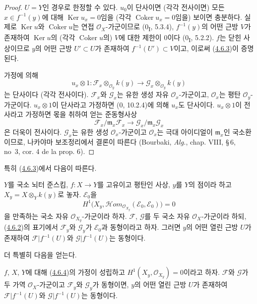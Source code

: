 \begin{proof}
$U=Y$인 경우로 한정할 수 있다. $u_0$이 단사이면 (각각 전사이면)
모든 $x\in f^{-1}(y)$에 대해 $\operatorname{Ker}u_x=0$임을
(각각 $\operatorname{Coker}u_x=0$임을) 보이면 충분하다. 실제로
$\operatorname{Ker}u$와 $\operatorname{Coker}u$는 연접
$\mathcal O_X$-가군이므로 (0\textsubscript{I}, 5.3.4),
$f^{-1}(y)$의 어떤 근방 $V$가 존재하여
$\operatorname{Ker}u$의 (각각 $\operatorname{Coker}u$의) $V$에
대한 제한이 $0$이다 (0\textsubscript{I}, 5.2.2). $f$는 닫힌
사상이므로 $y$의 어떤 근방 $U'\subset U$가 존재하여
$f^{-1}(U')\subset V$이고, 이로써
(\hyperref[III.4.6.3-fr]{4.6.3})이 증명된다.

가정에 의해
\[
u_x\otimes1:
\mathcal F_x\otimes_{\mathcal O_y}k(y)
\longrightarrow
\mathcal G_x\otimes_{\mathcal O_y}k(y)
\]
는 단사이다 (각각 전사이다). $\mathcal F_x$와 $\mathcal G_x$는
유한 생성 자유 $\mathcal O_x$-가군이고, $\mathcal O_x$는 평탄
$\mathcal O_y$-가군이다. $u_x\otimes1$이 단사라고 가정하면
(0, 10.2.4)에 의해 $u_x$도 단사이다. $u_x\otimes1$이 전사라고
가정하면 몫을 취하여 얻는 준동형사상
\[
\mathcal F_x/\mathfrak m_x\mathcal F_x
\longrightarrow
\mathcal G_x/\mathfrak m_x\mathcal G_x
\]
은 더욱이 전사이다. $\mathcal G_x$는 유한 생성
$\mathcal O_x$-가군이고 $\mathcal O_x$는 극대 아이디얼이
$\mathfrak m_x$인 국소환이므로, 나카야마 보조정리에서 결론이
따른다 (Bourbaki, \emph{Alg.}, chap. VIII, \S\,6, no~3,
cor. 4 de la prop. 6).
\end{proof}

특히 (\hyperref[III.4.6.3-fr]{4.6.3})에서 다음이 따른다.

\begin{corollary}[4.6.4]
\label{III.4.6.4-fr}
$Y$를 국소 뇌터 준스킴, $f:X\to Y$를 고유이고 평탄인 사상,
$y$를 $Y$의 점이라 하고 $X_y=X\otimes_Yk(y)$로 놓자.
$\mathcal E_0$을
\[
\label{III.4.6.4.1-fr}
H^1\bigl(X_y,
\mathcal{H}\!om_{\mathcal O_{X_y}}(\mathcal E_0,\mathcal E_0)\bigr)=0
\tag{4.6.4.1}
\]
을 만족하는 국소 자유 $\mathcal O_{X_y}$-가군이라 하자.
$\mathcal F$, $\mathcal G$를 두 국소 자유 $\mathcal O_X$-가군이라
하되, (\hyperref[III.4.6.2-fr]{4.6.2})의 표기에서
$\mathcal F_y$와 $\mathcal G_y$가 $\mathcal E_0$과 동형이라고
하자. 그러면 $y$의 어떤 열린 근방 $U$가 존재하여
$\mathcal F|f^{-1}(U)$와 $\mathcal G|f^{-1}(U)$는 동형이다.
\end{corollary}

더 특별히 다음을 얻는다.

\begin{corollary}[4.6.5]
\label{III.4.6.5-fr}
$f$, $X$, $Y$에 대해 (\hyperref[III.4.6.4-fr]{4.6.4})의 가정이
성립하고 $H^1(X_y,\mathcal O_{X_y})=0$이라고 하자.
$\mathcal F$와 $\mathcal G$가 두 가역 $\mathcal O_X$-가군이고
$\mathcal F_y$와 $\mathcal G_y$가 동형이면, $y$의 어떤 열린 근방
$U$가 존재하여 $\mathcal F|f^{-1}(U)$와
$\mathcal G|f^{-1}(U)$는 동형이다.
\end{corollary}

